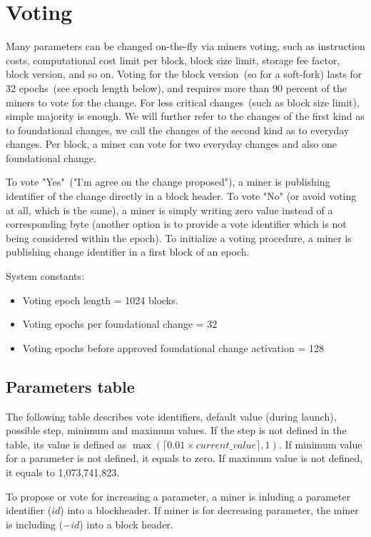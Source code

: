 \section{Voting}

Many parameters can be changed on-the-fly via miners voting, such as instruction costs, computational cost limit per block,
block size limit, storage fee factor, block version, and so on. Voting for the block version~(so for a soft-fork)
lasts for 32 epochs~(see epoch length below), and requires more than 90 percent of the miners to vote for the change.
For less critical changes~(such as block size limit), simple majority is enough. We will further refer to the changes
of the first kind as to foundational changes, we call the changes of the second kind as to everyday changes.
Per block, a miner can vote for two everyday changes and also one foundational change.

To vote "Yes"~("I'm agree on the change proposed"), a miner is publishing identifier of the change directly in a
block header. To vote "No" (or avoid voting at all, which is the same), a miner is simply writing zero value instead of
a corresponding byte (another option is to provide a vote identifier which is not being considered within the epoch).
To initialize a voting procedure, a miner is publishing change identifier in a first block of an epoch.

System constants:
\begin{itemize}
\item{} Voting epoch length = 1024 blocks.
\item{} Voting epochs per foundational change = 32
\item{} Voting epochs before approved foundational change activation = 128
\end{itemize}

\subsection{Parameters table}
\label{sec:params-table}

The following table describes vote identifiers, default value (during launch), possible step, minimum and maximum values.
If the step is not defined in the table, its value is defined as $\max(\lceil0.01 \times current\_value\rceil, 1)$.
If minimum value for a parameter is not defined, it equals to zero. If maximum value is not defined, it equals to
1,073,741,823.

To propose or vote for increasing a parameter, a miner is inluding a parameter identifier ($id$) into a blockheader.
If miner is for decreasing parameter, the miner is including ($-id$) into a block header.

